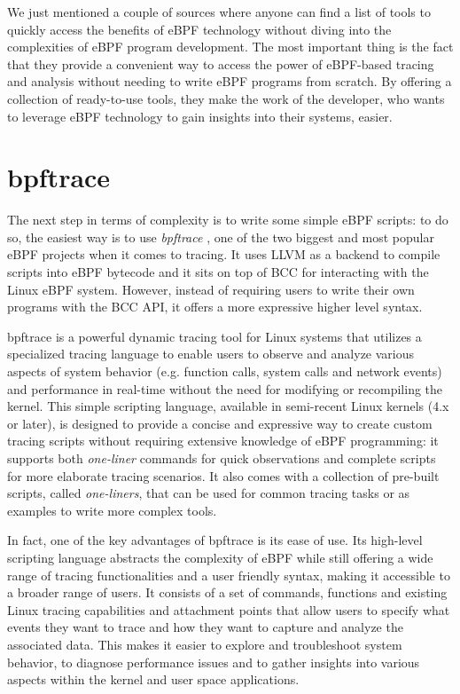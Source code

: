 We just mentioned a couple of sources where anyone can find a list of tools to quickly access the benefits of eBPF technology without diving into the complexities of eBPF program development.
The most important thing is the fact that they provide a convenient way to access the power of eBPF-based tracing and analysis without needing to write eBPF programs from scratch. 
By offering a collection of ready-to-use tools, they make the work of the developer, who wants to leverage eBPF technology to gain insights into their systems, easier.

\section{bpftrace}

The next step in terms of complexity is to write some simple eBPF scripts: to do so, the easiest way is to use \textit{bpftrace} \cite{bpftraceRepo}, one of the two biggest and most popular eBPF projects when it comes to tracing.
It uses LLVM as a backend to compile scripts into eBPF bytecode and it sits on top of BCC for interacting with the Linux eBPF system.
However, instead of requiring users to write their own programs with the BCC API, it offers a more expressive higher level syntax.

bpftrace is a powerful dynamic tracing tool for Linux systems that utilizes a specialized tracing language to enable users to observe and analyze various aspects of system behavior (e.g. function calls, system calls and network events) and performance in real-time without the need for modifying or recompiling the kernel.
This simple scripting language, available in semi-recent Linux kernels (4.x or later), is designed to provide a concise and expressive way to create custom tracing scripts without requiring extensive knowledge of eBPF programming: it supports both \textit{one-liner} commands for quick observations and complete scripts for more elaborate tracing scenarios.
It also comes with a collection of pre-built scripts, called \textit{one-liners}, that can be used for common tracing tasks or as examples to write more complex tools. 

In fact, one of the key advantages of bpftrace is its ease of use. 
Its high-level scripting language abstracts the complexity of eBPF while still offering a wide range of tracing functionalities and a user friendly syntax, making it accessible to a broader range of users. 
It consists of a set of commands, functions and existing Linux tracing capabilities and attachment points that allow users to specify what events they want to trace and how they want to capture and analyze the associated data.
This makes it easier to explore and troubleshoot system behavior, to diagnose performance issues and to gather insights into various aspects within the kernel and user space applications.

